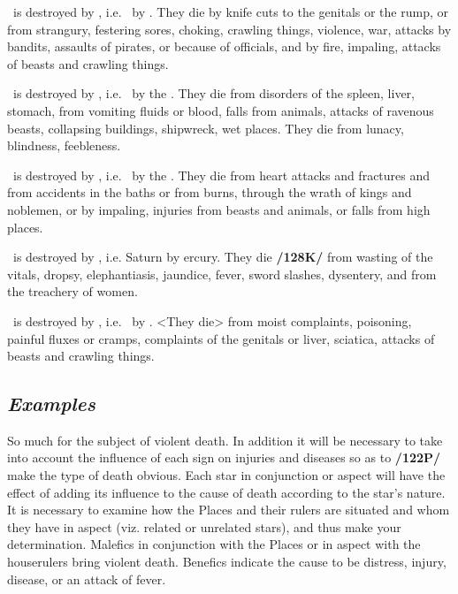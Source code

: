 \Scorpio\, \mn{\Scorpio} is destroyed by \Gemini, i.e. \Mars\, by \Mercury. They die by knife cuts to the genitals or the rump, or from strangury, festering sores, choking, crawling things, violence, war, attacks by bandits, assaults of pirates, or because of officials, and by fire, impaling, attacks of beasts and crawling things.

\Sagittarius\, \mn{\Sagittarius} is destroyed by \Cancer, i.e. \Jupiter\, by the \Moon. They die from disorders of the spleen, liver, stomach, from vomiting fluids or blood, falls from animals, attacks of ravenous beasts, collapsing buildings, shipwreck, wet places. They die from lunacy, blindness, feebleness. 

\Capricorn\, \mn{\Capricorn} is destroyed by \Leo, i.e. \Saturn\, by the \Sun. They die from heart attacks and fractures and from accidents in the baths or from burns, through the wrath of kings and noblemen, or by impaling, injuries from beasts and animals, or falls from high places.

\Aquarius\, \mn{\Aquarius} is destroyed by \Virgo, i.e. Saturn by ercury. They die \textbf{/128K/} from wasting of the vitals, dropsy, elephantiasis, jaundice, fever, sword slashes, dysentery, and from the treachery of women.

\Pisces\, \mn{\Pisces} is destroyed by \Libra, i.e. \Jupiter\, by \Venus. <They die> from moist complaints, poisoning, painful fluxes or cramps, complaints of the genitals or liver, sciatica, attacks of beasts and crawling things.

\subsection{\textit{Examples}}
So much for the subject of violent death. In addition it will be necessary to take into account the influence of each sign on injuries and diseases so as to \textbf{/122P/} make the type of death obvious. Each star in conjunction or aspect will have the effect of adding its influence to the cause of death according to the star’s nature. It is necessary to examine how the Places and their rulers are situated and whom they have in aspect (viz. related or unrelated stars), and thus make your determination. Malefics in conjunction with the Places or in aspect with the houserulers bring violent death. Benefics indicate the cause to be distress, injury, disease, or an attack of fever. 

